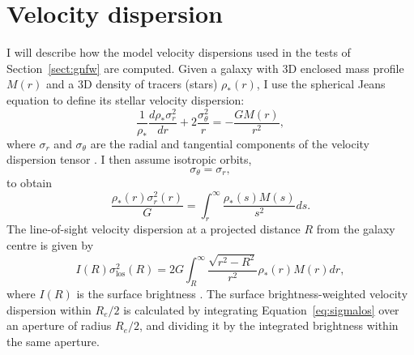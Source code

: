 \documentclass[usenatbib]{mnras}
\def\reff{R_e}
\def\Sref#1{Section~\ref{#1}\xspace}
\def\Eref#1{Equation~\ref{#1}\xspace}
\begin{document}
\section{Velocity dispersion}\label{sect:appendixd}
I will describe how the model velocity dispersions used in the tests of \Sref{sect:gnfw} are computed.
Given a galaxy with 3D enclosed mass profile $M(r)$ and a 3D density of tracers (stars) $\rho_*(r)$, I use the spherical Jeans equation to define its stellar velocity dispersion:
\begin{equation}
\frac{1}{\rho_*}\frac{d\rho_*\sigma_r^2}{dr} + 2\frac{\sigma_\theta^2}{r} = -\frac{GM(r)}{r^2},
\end{equation}
where $\sigma_r$ and $\sigma_\theta$ are the radial and tangential components of the velocity dispersion tensor \citep{B+T87}.
I then assume isotropic orbits,
\begin{equation}
\sigma_\theta = \sigma_r,
\end{equation}
to obtain
\begin{equation}
\frac{\rho_*(r)\sigma_r^2(r)}{G} = \int_r^\infty \frac{\rho_*(s) M(s)}{s^2}ds.
\end{equation}
The line-of-sight velocity dispersion at a projected distance $R$ from the galaxy centre is given by
\begin{equation}\label{eq:sigmalos}
I(R)\sigma_{\mathrm{los}}^2(R) = 2G \int_R^\infty \frac{\sqrt{r^2 - R^2}}{r^2}\rho_*(r)M(r)dr,
\end{equation}
where $I(R)$ is the surface brightness \citep{P+S97}. The surface brightness-weighted velocity dispersion within $\reff/2$ is calculated by integrating \Eref{eq:sigmalos} over an aperture of radius $\reff/2$, and dividing it by the integrated brightness within the same aperture.
\end{document}

